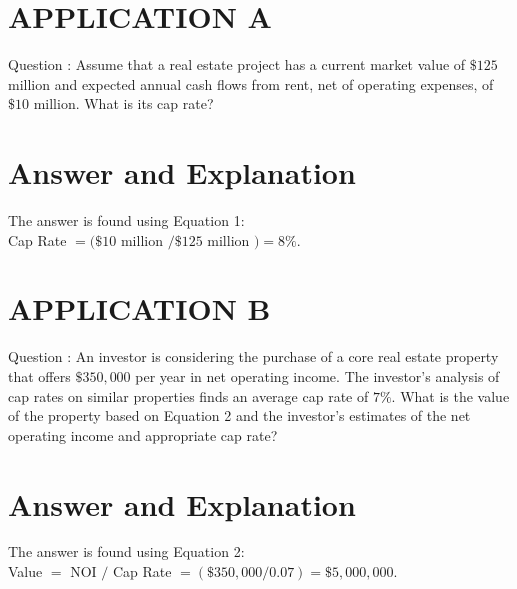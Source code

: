 \documentclass[11pt]{article}
\begin{document}
\section*{APPLICATION A}
Question : Assume that a real estate project has a current market value of $\$ 125$ million and expected annual cash flows from rent, net of operating expenses, of $\$ 10$ million. What is its cap rate?

\section*{Answer and Explanation}
The answer is found using Equation 1:\\
Cap Rate $=(\$ 10$ million $/ \$ 125$ million $)=8 \%$.

\section*{APPLICATION B}
Question : An investor is considering the purchase of a core real estate property that offers $\$ 350,000$ per year in net operating income. The investor's analysis of cap rates on similar properties finds an average cap rate of $7 \%$. What is the value of the property based on Equation 2 and the investor's estimates of the net operating income and appropriate cap rate?

\section*{Answer and Explanation}
The answer is found using Equation 2:\\
Value $=$ NOI $/$ Cap Rate $=(\$ 350,000 / 0.07)=\$ 5,000,000$.
\end{document}
